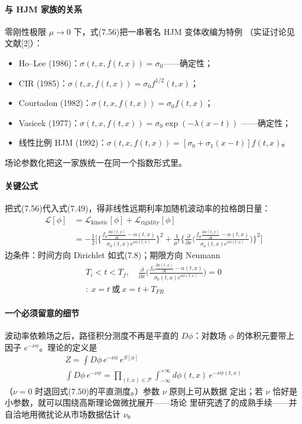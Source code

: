 \paragraph{与 HJM 家族的关系}
零刚性极限 $\mu\to0$ 下，式(7.56)把一串著名 HJM 变体收编为特例
（实证讨论见文献[2]）：
\begin{itemize}
\item Ho--Lee (1986)：$\sigma(t,x,f(t,x))=\sigma_0$——确定性；
\item CIR (1985)：$\sigma(t,x,f(t,x))=\sigma_0 f^{1/2}(t,x)$；
\item Courtadon (1982)：$\sigma(t,x,f(t,x))=\sigma_0 f(t,x)$；
\item Vasicek (1977)：$\sigma(t,x,f(t,x))=\sigma_0\exp(-\lambda(x-t))$
——确定性；
\item 线性比例 HJM (1992)：$\sigma(t,x,f(t,x))=[\sigma_0+\sigma_1(x-t)]f(t,x)$。
\end{itemize}
场论参数化把这一家族统一在同一个指数形式里。

\paragraph{关键公式}
把式(7.56)代入式(7.49)，得非线性远期利率加随机波动率的拉格朗日量：
\begin{align*}
\mathcal{L}[\phi]&=\mathcal{L}_{\mathrm{kinetic}}[\phi]
+\mathcal{L}_{\mathrm{rigidity}}[\phi]\\
&=-\frac{1}{2}\Biggl[\biggl\{\frac{f_0\frac{\partial\phi(t,x)}
{\partial t}-\alpha(t,x)}{\sigma_0(t,x)e^{\nu\phi(t,x)}}\biggr\}^{2}
+\frac{1}{\mu^{2}}\biggl\{\frac{\partial}{\partial x}
\biggl(\frac{f_0\frac{\partial\phi(t,x)}{\partial t}-\alpha(t,x)}
{\sigma_0(t,x)e^{\nu\phi(t,x)}}\biggr)\biggr\}^{2}\Biggr]
\tag{7.57}
\end{align*}
边条件：时间方向 Dirichlet 如式(7.8)；期限方向 Neumann
\begin{gather*}
T_i<t<T_f,\quad
\frac{\partial}{\partial x}\biggl(\frac{f_0\frac{\partial\phi(t,x)}
{\partial t}-\alpha(t,x)}{\sigma_0(t,x)e^{\nu\phi(t,x)}}\biggr)=0\\
:\ x=t\ \text{或}\ x=t+T_{FR}
\tag{7.58}
\end{gather*}

\paragraph{一个必须留意的细节}
波动率依赖场之后，路径积分测度不再是平直的 $D\phi$：对数场 $\phi$
的体积元要带上因子 $e^{-\nu\phi}$。理论的定义是
\begin{gather*}
Z=\int D\phi\,e^{-\nu\phi}\,e^{S[\phi]}\\
\int D\phi\,e^{-\nu\phi}=\prod_{(t,x)\in\mathcal{P}}
\int_{-\infty}^{+\infty}d\phi(t,x)\,e^{-\nu\phi(t,x)}
\tag{7.59}
\end{gather*}
（$\nu=0$ 时退回式(7.50)的平直测度。）参数 $\nu$ 原则上可从数据
定出；若 $\nu$ 恰好是小参数，就可以围绕高斯理论做微扰展开——场论
里研究透了的成熟手续——并自洽地用微扰论从市场数据估计 $\nu$。

